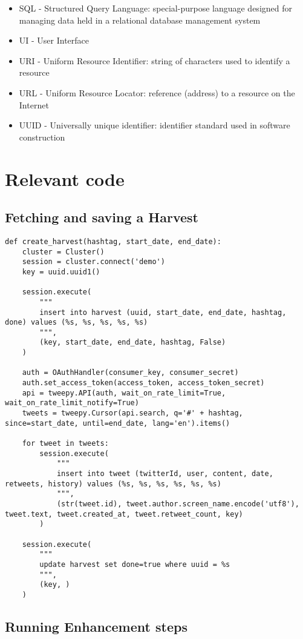 \begin{itemize}
\item SQL - Structured Query Language: special-purpose language designed for managing data held in a relational database management system
\item UI - User Interface
\item URI - Uniform Resource Identifier: string of characters used to identify a resource
\item URL - Uniform Resource Locator: reference (address) to a resource on the Internet
\item UUID - Universally unique identifier: identifier standard used in software construction
\end{itemize}

\chapter{Relevant code}
\section{Fetching and saving a Harvest}
\begin{lstlisting}
def create_harvest(hashtag, start_date, end_date):
    cluster = Cluster()
    session = cluster.connect('demo')
    key = uuid.uuid1()

    session.execute(
        """
        insert into harvest (uuid, start_date, end_date, hashtag, done) values (%s, %s, %s, %s, %s)
        """,
        (key, start_date, end_date, hashtag, False)
    )

    auth = OAuthHandler(consumer_key, consumer_secret)
    auth.set_access_token(access_token, access_token_secret)
    api = tweepy.API(auth, wait_on_rate_limit=True, wait_on_rate_limit_notify=True)
    tweets = tweepy.Cursor(api.search, q='#' + hashtag, since=start_date, until=end_date, lang='en').items()

    for tweet in tweets:
        session.execute(
            """
            insert into tweet (twitterId, user, content, date, retweets, history) values (%s, %s, %s, %s, %s, %s)
            """,
            (str(tweet.id), tweet.author.screen_name.encode('utf8'), tweet.text, tweet.created_at, tweet.retweet_count, key)
        )

    session.execute(
        """
        update harvest set done=true where uuid = %s
        """,
        (key, )
    )
\end{lstlisting}

\section{Running Enhancement steps}
